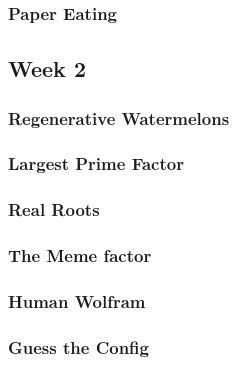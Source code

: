 \documentclass[titlepage=true]{scrartcl}
\begin{document}
        \subsubsection{Paper Eating}
            \label{1-1-7}
            
        \newpage
        
    \subsection{Week 2}

        \subsubsection{Regenerative Watermelons}
            \label{1-2-1}
            
        \newpage 

        \subsubsection{Largest Prime Factor}
            \label{1-2-2}       
            
        \newpage

        \subsubsection{Real Roots}
            \label{1-2-3}
            
        \newpage 

        \subsubsection{The Meme factor}
            \label{1-2-4}
            
        \newpage

        \subsubsection{Human Wolfram}
            \label{1-2-5}
            
        \newpage 

        \subsubsection{Guess the Config}
            \label{1-2-6}
            
        \newpage 
        
\end{document}
